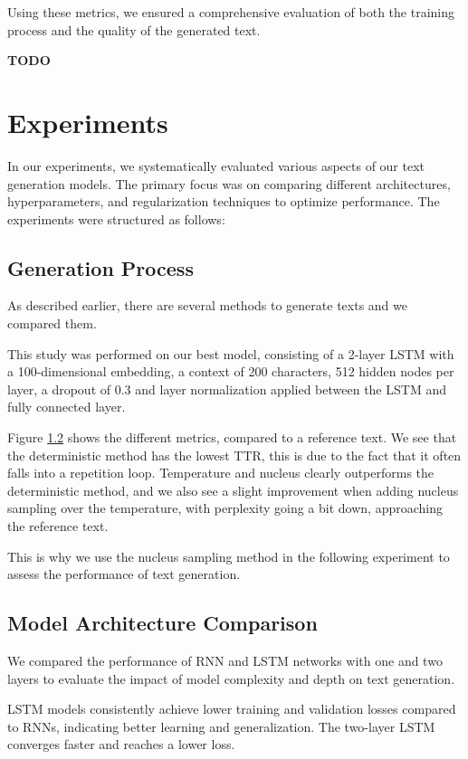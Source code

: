\documentclass{article}
\begin{document}
Using these metrics, we ensured a comprehensive evaluation of both the training process and the quality of the generated text.


\textbf{TODO}

\section{Experiments}

In our experiments, we systematically evaluated various aspects of our text generation models. The primary focus was on comparing different architectures, hyperparameters, and regularization techniques to optimize performance. The experiments were structured as follows:

\subsection{Generation Process}\label{Generation study}

As described earlier, there are several methods to generate texts and we compared them. 

This study was performed on our best model, consisting of a 2-layer LSTM with a 100-dimensional embedding, a context of 200 characters, 512 hidden nodes per layer, a dropout of 0.3 and layer normalization applied between the LSTM and fully connected layer.

Figure \ref{} shows the different metrics, compared to a reference text.
We see that the deterministic method has the lowest TTR, this is due to the fact that it often falls into a repetition loop. Temperature and nucleus clearly outperforms the deterministic method, and we also see a slight improvement when adding nucleus sampling over the temperature, with perplexity going a bit down, approaching the reference text.   

This is why we use the nucleus sampling method in the following experiment to assess the performance of text generation.

\subsection{Model Architecture Comparison}

We compared the performance of RNN and LSTM networks with one and two layers to evaluate the impact of model complexity and depth on text generation.

LSTM models consistently achieve lower training and validation losses compared to RNNs, indicating better learning and generalization. The two-layer LSTM converges faster and reaches a lower loss.
\end{document}
